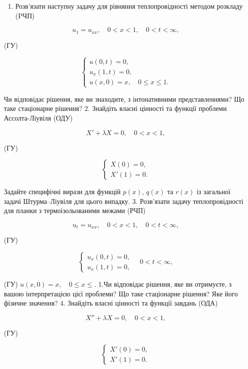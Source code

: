 \documentclass[
  ukrainian,
]{article}
\providecommand{\tightlist}{%
  \setlength{\itemsep}{0pt}\setlength{\parskip}{0pt}}
\begin{document}
\begin{enumerate}
\def\labelenumi{\arabic{enumi}.}
\tightlist
\item
  Розв'язати наступну задачу для рівняння теплопровідності методом
  розкладу (PЧП)
\end{enumerate}

\[
u_1 = u_{xx}, \quad 0 < x < 1, \quad 0 < t < \infty,
\]

(ГУ)

\[
\begin{cases} u(0, t) = 0, \\ u_x(1, t) = 0, \\ u(x, 0) = x, \quad 0 \le x \le 1. \end{cases}
\]

Чи відповідає рішення, яке ви знаходите, з інтонативними
представленнями? Що таке стаціонарне рішення? 2. Знайдіть власні
цінності та функції проблеми Ассолта-Ліувіля (ОДУ)

\[
X' + \lambda X = 0, \quad 0 < x < 1,
\]

(ГУ)

\[
\begin{cases} X(0) = 0, \\ X'(1) = 0. \end{cases}
\]

Задайте специфічні вирази для функцій \(p(x)\), \(q(x)\) та \(r(x)\) із
загальної задачі Штурма--Ліувіля для цього випадку. 3. Розв'язати задачу
теплопровідності для планки з термоізольованими межами (РЧП)

\[
u_t = u_{xx}, \quad 0 < x < 1, \quad 0 < t < \infty,
\]

(ГУ)

\[
\begin{cases} u_x (0, t) = 0, \\ u_x (1, t) = 0, \end{cases} \quad 0 < t < \infty,
\]

(ГУ) \(u(x, 0) = x, \quad 0 \le x \le.\) 1.Чи відповідає рішення, яке ви
отримуєте, з вашою інтерпретацією цієї проблеми? Що таке стаціонарне
рішення? Яке його фізичне значення? 4. Знайдіть власні цінності та
функції завдань (ОДА)

\[
X'' + \lambda X = 0, \quad 0 < x < 1,
\]

(ГУ)

\[
\begin{cases} X'(0) = 0, \\ X'(1) = 0. \end{cases}
\]
\end{document}
